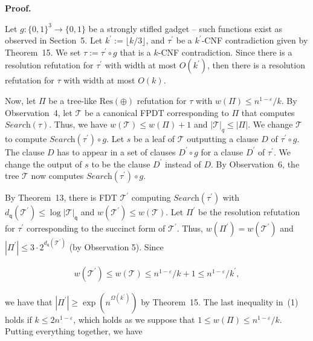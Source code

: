\par\medskip\noindent\textbf{Proof.}\par




Let $g:\{0,1\}^{3}\to\{0,1\}$ be a strongly stifled gadget – such functions exist as observed in Section 5.
Let $k^{\prime}:=\lfloor k/3\rfloor$, and $\tau^{\prime}$ be a $k^{\prime}$-CNF contradiction given by Theorem 15.
We set $\tau:=\tau^{\prime}\circ g$ that is a $k$-CNF contradiction.
Since there is a resolution refutation for $\tau^{\prime}$ with width at most $O(k^{\prime})$, then there is a resolution refutation for $\tau$ with width at most $O(k)$.\par




Now, let $\Pi$ be a tree-like $\text{Res}(\oplus)$ refutation for $\tau$ with $w(\Pi)\leq n^{1-\varepsilon}/k$.
By Observation 4, let $\mathcal{T}$ be a canonical FPDT corresponding to $\Pi$ that computes $\textit{Search}(\tau)$.
Thus, we have $w(\mathcal{T})\leq w(\Pi)+1$ and $|\mathcal{T}|_{q}\leq|\Pi|$.
We change $\mathcal{T}$ to compute $\textit{Search}(\tau^{\prime})\circ g$.
Let $s$ be a leaf of $\mathcal{T}$ outputting a clause $D$ of $\tau^{\prime}\circ g$.
The clause $D$ has to appear in a set of clauses $D^{\prime}\circ g$ for a clause $D^{\prime}$ of $\tau^{\prime}$.
We change the output of $s$ to be the clause $D^{\prime}$ instead of $D$.
By Observation 6, the tree $\mathcal{T}$ now computes $\textit{Search}(\tau^{\prime})\circ g$.\par




By Theorem 13, there is FDT $\mathcal{T}^{\prime}$ computing $\textit{Search}(\tau^{\prime})$ with $d_{\mathsf{q}}(\mathcal{T}^{\prime})\leq\log|\mathcal{T}|_{\mathsf{q}}$ and $w(\mathcal{T}^{\prime})\leq w(\mathcal{T})$.
Let $\Pi^{\prime}$ be the resolution refutation for $\tau^{\prime}$ corresponding to the succinct form of $\mathcal{T}^{\prime}$.
Thus, $w(\Pi^{\prime})=w(\mathcal{T}^{\prime})$ and $|\Pi^{\prime}|\leq 3\cdot 2^{d_{\mathsf{q}}(\mathcal{T}^{\prime})}$ (by Observation 5).
Since\par


\[\begin{gathered}
w(\mathcal{T}^{\prime})\leq w(\mathcal{T})\leq n^{1-\varepsilon}/k+1\leq n^{1-%
\varepsilon}/k^{\prime},
\end{gathered}\]


we have that $|\Pi^{\prime}|\geq\exp(n^{\Omega(k^{\prime})})$ by Theorem 15.
The last inequality in (1) holds if $k\leq 2n^{1-\varepsilon}$, which holds as we suppose that $1\leq w(\Pi)\leq n^{1-\varepsilon}/k$.
Putting everything together, we have\par


